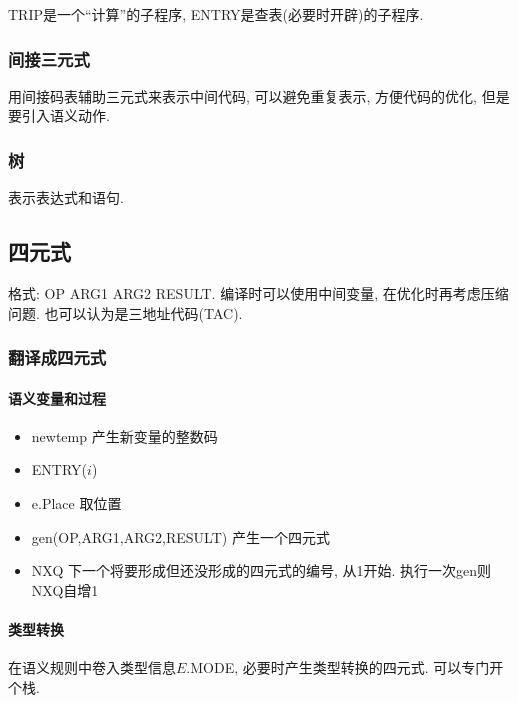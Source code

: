                 TRIP是一个``计算''的子程序, ENTRY是查表(必要时开辟)的子程序.

            \subsubsection{间接三元式}

                用间接码表辅助三元式来表示中间代码, 可以避免重复表示, 方便代码的优化, 但是要引入语义动作.

            \subsubsection{树}

                表示表达式和语句.

        \subsection{四元式}

            格式: OP ARG1 ARG2 RESULT. 编译时可以使用中间变量, 在优化时再考虑压缩问题. 也可以认为是\textsf{三地址代码}(TAC).

            \subsubsection{翻译成四元式}

                \paragraph{语义变量和过程}
                \begin{itemize}
                    \item newtemp 产生新变量的整数码
                    \item ENTRY($i$)
                    \item e.Place 取位置
                    \item gen(OP,ARG1,ARG2,RESULT) 产生一个四元式
                    \item NXQ 下一个将要形成但还没形成的四元式的编号, 从1开始. 执行一次gen则NXQ自增1
                \end{itemize}

                \paragraph{类型转换}
                    在语义规则中卷入类型信息$E$.MODE, 必要时产生类型转换的四元式. 可以专门开个栈.

